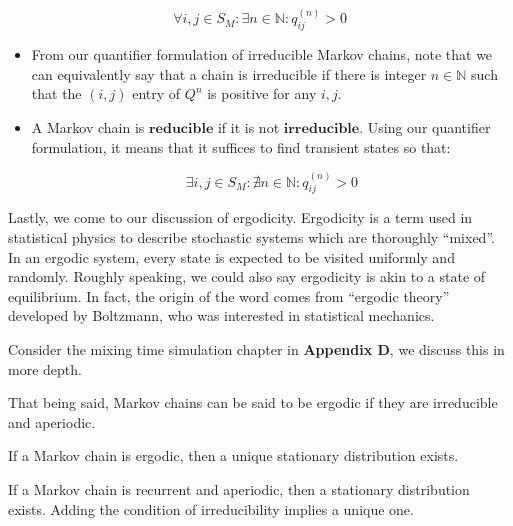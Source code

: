 $$\forall i,j \in S_M: \exists n \in \mathbb{N} : q_{ij}^{(n)} > 0$$
\begin{itemize}
\item From our quantifier formulation of irreducible Markov chains, note that we can equivalently say that a chain is irreducible if there is integer $n \in \mathbb{N}$ such that the $(i,j)$ entry of $Q^n$ is positive for any $i,j$.

\item A Markov chain is $\textbf{reducible}$ if it is not $\textbf{irreducible}$. Using our quantifier formulation, it means that it suffices to find transient states so that:

$$\exists i,j \in S_M: \nexists n \in \mathbb{N} : q_{ij}^{(n)} > 0$$
\end{itemize}


\begin{definition}[Periodicity]
\end{definition}


Lastly, we come to our discussion of ergodicity. Ergodicity is a term used in statistical physics to describe stochastic systems which are thoroughly ``mixed''.
In an ergodic system, every state is expected to be visited uniformly and randomly. Roughly speaking, we could also say ergodicity is akin to a state of equilibrium.
In fact, the origin of the word comes from ``ergodic theory'' developed by Boltzmann, who was interested in statistical mechanics.

\begin{definition}[Ergodicity]
\end{definition}

Consider the mixing time simulation chapter in \textbf{Appendix D}, we discuss this in more depth.

That being said, Markov chains can be said to be ergodic if they are irreducible and aperiodic.

If a Markov chain is ergodic, then a unique stationary distribution exists.

If a Markov chain is recurrent and aperiodic, then a stationary distribution exists.
Adding the condition of irreducibility implies a unique one.

